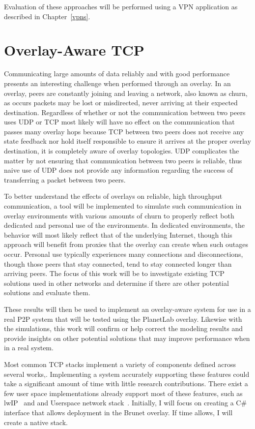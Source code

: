 Evaluation of these approaches will be performed using a VPN application as
described in Chapter~\ref{vpns}.

\section{Overlay-Aware TCP}
\label{tcp}
Communicating large amounts of data reliably and with good performance presents
an interesting challenge when performed through an overlay.  In an overlay,
peers are constantly joining and leaving a network, also known as churn, as
occurs packets may be lost or misdirected, never arriving at their expected
destination.  Regardless of whether or not the communication between two peers
uses UDP or TCP most likely will have no effect on the communication that passes
many overlay hops because TCP between two peers does not receive any state
feedback nor hold itself responsible to ensure it arrives at the proper overlay
destination, it is completely aware of overlay topologies.  UDP complicates the
matter by not ensuring that communication between two peers is reliable, thus
naive use of UDP does not provide any information regarding the success of
transferring a packet between two peers.

To better understand the effects of overlays on reliable, high throughput
communication, a tool will be implemented to simulate such communication in
overlay environments with various amounts of churn to properly reflect both
dedicated and personal use of the environments.  In dedicated environments, the
behavior will most likely reflect that of the underlying Internet, though this
approach will benefit from proxies that the overlay can create when such outages
occur.  Personal use typically experiences many connections and disconnections,
though those peers that stay connected, tend to stay connected longer than
arriving peers.  The focus of this work will be to investigate existing TCP
solutions used in other networks and determine if there are other potential
solutions and evaluate them.

These results will then be used to implement an overlay-aware system for use in
a real P2P system that will be tested using the PlanetLab overlay.  Likewise with
the simulations, this work will confirm or help correct the modeling results and
provide insights on other potential solutions that may improve performance when
in a real system.

Most common TCP stacks implement a variety of components defined across
several works,\cite{tcp, tcp_congestion, tcp_hp, tcp_mss,
tcp_congestion_notification, tcp_sack}.  Implementing a system accurately
supporting these features could take a significant amount of time with little
research contributions.  There exist a few user space implementations already
support most of these features, such as lwIP~\cite{lwip} and and Userspace
network stack~\cite{unetstack}.  Initially, I will focus on creating a C\#
interface that allows deployment in the Brunet overlay.  If time allows, I will
create a native stack.

